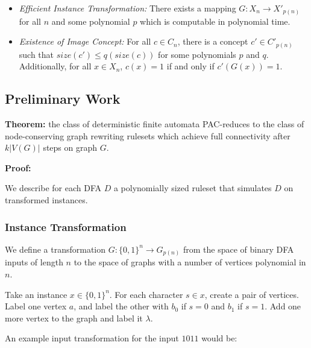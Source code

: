 \documentclass[]{article}
\providecommand{\tightlist}{%
  \setlength{\itemsep}{0pt}\setlength{\parskip}{0pt}}
\begin{document}
\begin{itemize}
\tightlist
\item
  \emph{Efficient Instance Transformation:} There exists a mapping
  \(G: X_n \to X'_{p(n)}\) for all \(n\) and some polynomial \(p\) which
  is computable in polynomial time.
\item
  \emph{Existence of Image Concept:} For all \(c \in C_n\), there is a
  concept \(c' \in C'_{p(n)}\) such that \(size(c') \leq q(size(c))\)
  for some polynomials \(p\) and \(q\). Additionally, for all
  \(x \in X_n\), \(c(x) = 1\) if and only if \(c'(G(x)) = 1\).
\end{itemize}

\subsection{Preliminary Work}\label{preliminary-work}

\textbf{Theorem:} the class of deterministic finite automata PAC-reduces
to the class of node-conserving graph rewriting rulesets which achieve
full connectivity after \(k |V(G)|\) steps on graph \(G\).

\textbf{Proof:}

We describe for each DFA \(D\) a polynomially sized ruleset that
simulates \(D\) on transformed instances.

\subsubsection{Instance Transformation}\label{instance-transformation}

We define a transformation \(G: \{0,1\}^n \to G_{p(n)}\) from the space
of binary DFA inputs of length \(n\) to the space of graphs with a
number of vertices polynomial in \(n\).

Take an instance \(x \in \{0,1\}^n\). For each character \(s \in x\),
create a pair of vertices. Label one vertex \(a\), and label the other
with \(b_0\) if \(s=0\) and \(b_1\) if \(s=1\). Add one more vertex to
the graph and label it \(\lambda\).

An example input transformation for the input \(1011\) would be:

\end{document}
